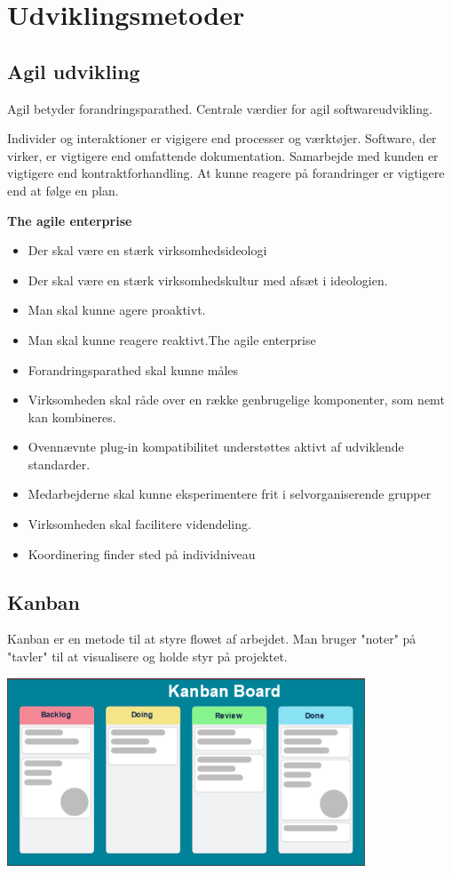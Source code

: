 \section{Udviklingsmetoder}

\subsection{Agil udvikling}
Agil betyder forandringsparathed.
Centrale værdier for agil softwareudvikling.

Individer og interaktioner er vigigere end processer og værktøjer. Software, der virker, er vigtigere end omfattende dokumentation.
Samarbejde med kunden er vigtigere end kontraktforhandling. At kunne reagere på forandringer er vigtigere end at følge en plan.


\textbf{The agile enterprise}
\begin{itemize}
	\item{Der skal være en stærk virksomhedsideologi}
	\item{Der skal være en stærk virksomhedskultur med afsæt i ideologien.}
	\item{Man skal kunne agere proaktivt.}
	\item{Man skal kunne reagere reaktivt.The agile enterprise}
	\item{Forandringsparathed skal kunne måles}
	\item{Virksomheden skal råde over en række genbrugelige komponenter, som nemt kan kombineres.}
	\item{Ovennævnte plug-in kompatibilitet understøttes aktivt af udviklende standarder.}
	\item{Medarbejderne skal kunne eksperimentere frit i selvorganiserende grupper}
	\item{Virksomheden skal facilitere videndeling.}
	\item {Koordinering finder sted på individniveau}
\end{itemize}

\subsection{Kanban}
Kanban er en metode til at styre flowet af arbejdet. Man bruger "noter" på "tavler" til at visualisere og holde styr på projektet.

\begin{center}
	\includegraphics[width=0.8\textwidth]{Images/Kanban.png}
\end{center}

